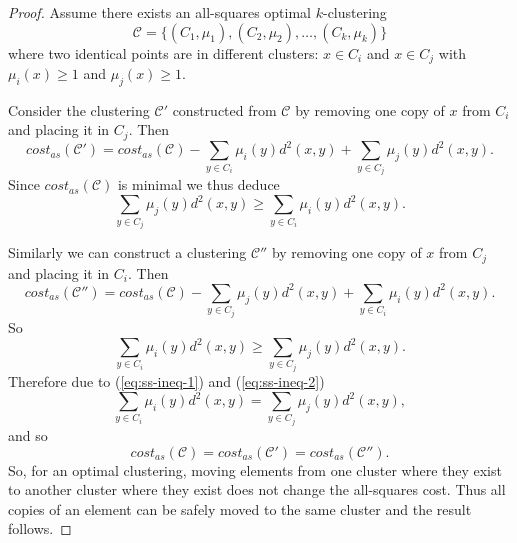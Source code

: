 \begin{proof}
  Assume there exists an all-squares optimal $k$-clustering
  \begin{equation*}
    \mathcal{C} = \{(C_1,\mu_1),(C_2,\mu_2),\dotsc,(C_k,\mu_k)\}
  \end{equation*}
  where two identical points are in different clusters: $x \in C_{i}$ and $x
  \in C_{j}$ with $\mu_i(x) \geq 1$ and $\mu_j(x) \geq 1$.

  Consider the clustering $\mathcal{C}'$ constructed from $\mathcal{C}$ by
  removing one copy of $x$ from $C_{i}$ and placing it in $C_{j}$.  Then
  \begin{equation*}
    cost_{as}(\mathcal{C}') = cost_{as}(\mathcal{C})
    - \sum_{y \in C_{i}} \mu_{i}(y) d^2(x,y)
    + \sum_{y \in C_{j}} \mu_{j}(y) d^2(x,y).
  \end{equation*}
  Since $cost_{as}(\mathcal{C})$ is minimal we thus deduce
  \begin{equation}
    \label{eq:ss-ineq-1}
    \sum_{y \in C_{j}} \mu_{j}(y) d^2(x,y) \geq
    \sum_{y \in C_{i}} \mu_{i}(y) d^2(x,y).
  \end{equation}

  Similarly we can construct a clustering $\mathcal{C}''$ by removing one copy
  of $x$ from $C_{j}$ and placing it in $C_{i}$.  Then
  \begin{equation*}
    cost_{as}(\mathcal{C}'') = cost_{as}(\mathcal{C})
    - \sum_{y \in C_{j}} \mu_{j}(y) d^2(x,y)
    + \sum_{y \in C_{i}} \mu_{i}(y) d^2(x,y).
  \end{equation*}
  So
  \begin{equation}
    \label{eq:ss-ineq-2}
    \sum_{y \in C_{i}} \mu_{i}(y) d^2(x,y) \geq
    \sum_{y \in C_{j}} \mu_{j}(y) d^2(x,y).
  \end{equation}
  Therefore due to (\ref{eq:ss-ineq-1}) and (\ref{eq:ss-ineq-2})
  \begin{equation*}
    \sum_{y \in C_{i}} \mu_{i}(y) d^2(x,y) =
    \sum_{y \in C_{j}} \mu_{j}(y) d^2(x,y),
  \end{equation*}
  and so
  \begin{equation*}
    cost_{as}(\mathcal{C}) = cost_{as}(\mathcal{C}') = cost_{as}(\mathcal{C}'').
  \end{equation*}
  So, for an optimal clustering, moving elements from one cluster where they
  exist to another cluster where they exist does not change the all-squares
  cost.  Thus all copies of an element can be safely moved to the same cluster
  and the result follows.
\end{proof}

